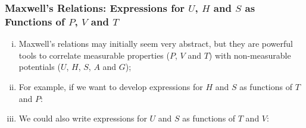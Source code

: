 \documentclass[10pt,compress,unknownkeysallowed]{beamer}
\begin{document}
\begin{frame}
  \frametitle{Maxwell's Relations: Expressions for $U$, $H$ and $S$ as Functions of $P$, $V$ and $T$}
      \begin{enumerate}[i)]
           \item<1-> Maxwell's relations may initially seem very abstract, but they are powerful tools to correlate measurable properties ($P$, $V$ and $T$) with non-measurable potentials ($U$, $H$, $S$, $A$ and $G$);
           \item<2-> For example, if we want to develop expressions for $H$ and $S$ as functions of $T$ and $P$:
           \item<3-> We could also write expressions for $U$ and $S$ as functions of $T$ and $V$:
      \end{enumerate}
\end{frame}
\normalsize
\end{document}
